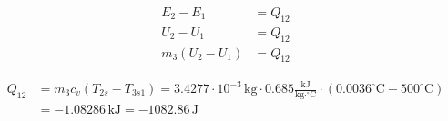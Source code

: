 

\item[c)] 
    \begin{align*}
        E_2 - E_1 &= Q_{12} \\
        U_2 - U_1 &= Q_{12} \\
        m_3 (U_2 - U_1) &= Q_{12}
    \end{align*}
    
    \begin{align*}
        Q_{12} &= m_3 c_v \left( T_{2s} - T_{3s1} \right) = 3.4277 \cdot 10^{-3} \, \text{kg} \cdot 0.685 \frac{\text{kJ}}{\text{kg} \cdot ^\circ \text{C}} \cdot \left( 0.0036^\circ \text{C} - 500^\circ \text{C} \right) \\
        &= -1.08286 \, \text{kJ} = -1082.86 \, \text{J}
    \end{align*}